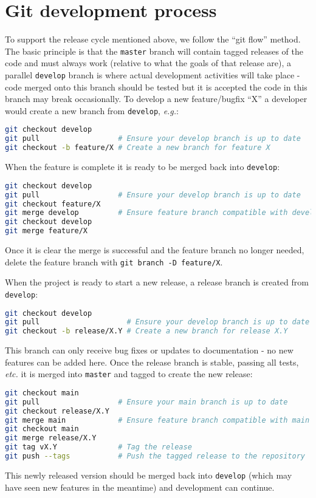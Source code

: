\documentclass[11pt]{report}
\begin{document}
\section{Git development process}
To support the release cycle mentioned above, we follow the ``git flow'' method.
The basic principle is that the \texttt{master} branch will contain tagged releases of the code and
must always work (relative to what the goals of that release are), a parallel \texttt{develop}
branch is where actual development activities will take place - code merged onto this branch should
be tested but it is accepted the code in this branch may break occasionally.
To develop a new feature/bugfix ``X'' a developer would create a new branch from \texttt{develop},
\textit{e.g.}:
\begin{lstlisting}[language=sh, basicstyle=\fontsize{9}{10}\ttfamily\label{lst:feature-branch}]
git checkout develop
git pull                  # Ensure your develop branch is up to date
git checkout -b feature/X # Create a new branch for feature X
\end{lstlisting}
When the feature is complete it is ready to be merged back into \texttt{develop}:
\begin{lstlisting}[language=sh, basicstyle=\fontsize{9}{10}\ttfamily\label{lst:feature-merge}]
git checkout develop
git pull                  # Ensure your develop branch is up to date
git checkout feature/X
git merge develop         # Ensure feature branch compatible with develop
git checkout develop
git merge feature/X
\end{lstlisting}
Once it is clear the merge is successful and the feature branch no longer needed, delete the feature
branch with \texttt{git branch -D feature/X}.

When the project is ready to start a new release, a release branch is created from \texttt{develop}:
\begin{lstlisting}[language=sh, basicstyle=\fontsize{9}{10}\ttfamily\label{lst:release-branch}]
git checkout develop
git pull                    # Ensure your develop branch is up to date
git checkout -b release/X.Y # Create a new branch for release X.Y
\end{lstlisting}
This branch can only receive bug fixes or updates to documentation - no new features can be added
here.
Once the release branch is stable, passing all tests, \textit{etc.} it is merged into \texttt{master}
and tagged to create the new release:
\begin{lstlisting}[language=sh, basicstyle=\fontsize{9}{10}\ttfamily\label{lst:release-merge}]
git checkout main
git pull                  # Ensure your main branch is up to date
git checkout release/X.Y
git merge main            # Ensure feature branch compatible with main
git checkout main
git merge release/X.Y
git tag vX.Y              # Tag the release
git push --tags           # Push the tagged release to the repository
\end{lstlisting}
This newly released version should be merged back into \texttt{develop} (which may have seen new
features in the meantime) and development can continue.
\end{document}
